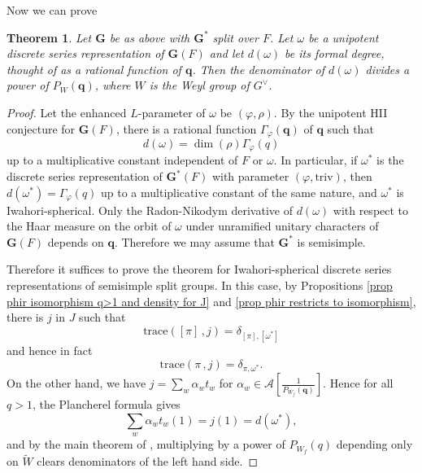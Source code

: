 \documentclass[10pt]{article}
\newcommand{\trace}[2]{\mathrm{trace}\left({#1}\,,{#2}\right)}
\newcommand{\G}{\mathbf{G}}
\newcommand{\triv}{\mathrm{triv}}
\newcommand{\bq}{\mathbf{q}}
\newtheorem{theorem}{Theorem}
\theoremstyle{definition}
\theoremstyle{remark}
\begin{document}
Now we can prove 
%
\begin{theorem}
\label{thm fdeg body}
Let $\G$ be as above with $\G^*$ split over $F$. Let $\omega$ be a unipotent discrete 
series representation of $\G(F)$ and let $d(\omega)$ be its formal degree, 
thought of as a rational function of $\bq$. 
Then the denominator of $d(\omega)$ divides a power of $P_W(\bq)$, where $W$ is 
the Weyl group of $G^\vee$.
\end{theorem}
%
\begin{proof}
Let the enhanced $L$-parameter of $\omega$ be $(\varphi, \rho)$. By the unipotent HII conjecture for $\G(F)$, 
there is a rational function $\Gamma_\varphi(\bq)$ of $\bq$ such that
%
\[
d(\omega)=\dim(\rho)\Gamma_\varphi(q)
\]
%
up to a multiplicative constant independent of $F$ or $\omega$. In particular, if $\omega^*$ is the 
discrete series representation of $\G^*(F)$ with parameter $(\varphi,\triv)$, then 
$d(\omega^*)=\Gamma_\varphi(q)$ up to a multiplicative constant of the same nature, and $\omega^*$ is 
Iwahori-spherical. Only the Radon-Nikodym derivative of $d(\omega)$ with respect to the 
Haar measure on the orbit of $\omega$ under unramified unitary characters of $\G(F)$ depends on $\bq$.
Therefore we may assume that $\G^*$ is semisimple.

Therefore it suffices to prove the theorem for Iwahori-spherical discrete series representations of semisimple 
split groups. In this case, by Propositions \ref{prop phir isomorphism q>1 and density for J} and
\ref{prop phir restricts to isomorphism}, there is $j$ in $J$ such that 
%
\[
\trace{[\pi]}{j}=\delta_{[\pi],[\omega^*]}
\]
%
and hence in fact
%
\[
\trace{\pi}{j}=\delta_{\pi,\omega^*}.
\]
%
On the other hand, we have $j=\sum_{w}\alpha_wt_w$ for $\alpha_w\in\mathcal{A}[\frac{1}{P_{W_f}(\bq)}]$. 
Hence for all $q>1$, the Plancherel formula gives
%
\[
\sum_{w}\alpha_w t_w(1)=j(1)=d(\omega^*),
\]
%
and by the main theorem of \cite{Plancherel}, multiplying by a power of $P_{W_f}(q)$ depending only on 
$\tilde{W}$ clears denominators of the left hand side.


\end{proof}
\end{document}
